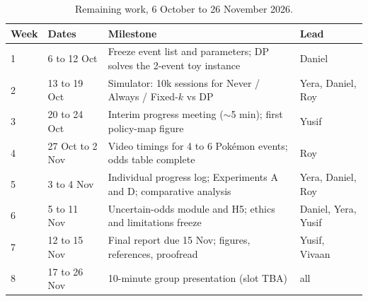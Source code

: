 \documentclass[11pt,a4paper]{article}
\begin{document}
\begin{table}[H]
\centering
\caption{Remaining work, 6 October to 26 November 2026.}
\renewcommand{\arraystretch}{1.02}
\small
\begin{tabularx}{\textwidth}{@{}l l X l@{}}
\toprule
\textbf{Week} & \textbf{Dates} & \textbf{Milestone} & \textbf{Lead} \\
\midrule
1 & 6 to 12 Oct & Freeze event list and parameters; DP solves the 2-event toy instance & Daniel \\
2 & 13 to 19 Oct & Simulator: 10k sessions for Never / Always / Fixed-\(k\) vs DP & Yera, Daniel, Roy \\
3 & 20 to 24 Oct & Interim progress meeting (\(\sim\)5 min); first policy-map figure & Yusif \\
4 & 27 Oct to 2 Nov & Video timings for 4 to 6 Pok\'emon events; odds table complete & Roy \\
5 & 3 to 4 Nov & Individual progress log; Experiments A and D; comparative analysis & Yera, Daniel, Roy \\
6 & 5 to 11 Nov & Uncertain-odds module and H5; ethics and limitations freeze & Daniel, Yera, Yusif \\
7 & 12 to 15 Nov & Final report due 15 Nov; figures, references, proofread & Yusif, Vivaan \\
8 & 17 to 26 Nov & 10-minute group presentation (slot TBA) & all \\
\bottomrule
\end{tabularx}
\end{table}
\end{document}

